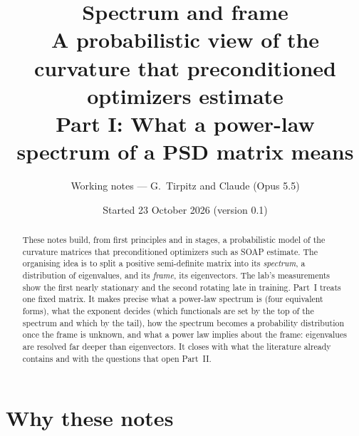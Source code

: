 \documentclass[11pt,a4paper]{article}
\title{Spectrum and frame\\[0.3em]
\large A probabilistic view of the curvature that preconditioned optimizers estimate\\[0.2em]
Part I: What a power-law spectrum of a PSD matrix means}
\author{Working notes --- G.~Tirpitz and Claude (Opus 5.5)}
\date{Started 23 October 2026 \quad (version 0.1)}
\theoremstyle{plain}
\theoremstyle{definition}
\theoremstyle{remark}
\begin{document}
\maketitle

\begin{abstract}
These notes build, from first principles and in stages, a probabilistic model of the curvature matrices that
preconditioned optimizers such as SOAP estimate. The organising idea is to split a positive semi-definite matrix
into its \emph{spectrum}, a distribution of eigenvalues, and its \emph{frame}, its eigenvectors. The lab's
measurements show the first nearly stationary and the second rotating late in training. Part~I treats one fixed
matrix. It makes precise what a power-law spectrum is (four equivalent forms), what the exponent decides (which
functionals are set by the top of the spectrum and which by the tail), how the spectrum becomes a probability
distribution once the frame is unknown, and what a power law implies about the frame: eigenvalues are resolved far
deeper than eigenvectors. It closes with what the literature already contains and with the questions that open
Part~II.
\end{abstract}

\tableofcontents

\section{Why these notes}
\end{document}

